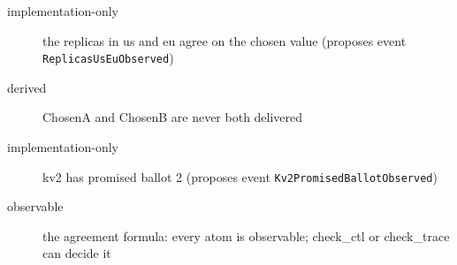 \begin{description}
\item[implementation-only] the replicas in us and eu agree on the chosen value (proposes event \texttt{ReplicasUsEuObserved})
\item[derived] ChosenA and ChosenB are never both delivered
\item[implementation-only] kv2 has promised ballot 2 (proposes event \texttt{Kv2PromisedBallotObserved})
\item[observable] the agreement formula: every atom is observable; check\_ctl or check\_trace can decide it
\end{description}
